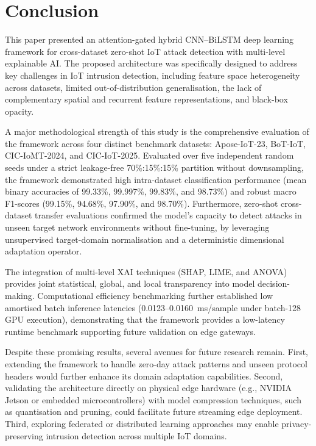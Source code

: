 \documentclass[a4paper,fleqn]{cas-sc}
\begin{document}
\section{Conclusion}
\label{sec:conclusion}
This paper presented an attention-gated hybrid CNN--BiLSTM deep learning framework for cross-dataset zero-shot IoT attack detection with multi-level explainable AI. The proposed architecture was specifically designed to address key challenges in IoT intrusion detection, including feature space heterogeneity across datasets, limited out-of-distribution generalisation, the lack of complementary spatial and recurrent feature representations, and black-box opacity.

A major methodological strength of this study is the comprehensive evaluation of the framework across four distinct benchmark datasets: Apose-IoT-23, BoT-IoT, CIC-IoMT-2024, and CIC-IoT-2025. Evaluated over five independent random seeds under a strict leakage-free 70\%:15\%:15\% partition without downsampling, the framework demonstrated high intra-dataset classification performance (mean binary accuracies of 99.33\%, 99.997\%, 99.83\%, and 98.73\%) and robust macro F1-scores (99.15\%, 94.68\%, 97.90\%, and 98.70\%). Furthermore, zero-shot cross-dataset transfer evaluations confirmed the model's capacity to detect attacks in unseen target network environments without fine-tuning, by leveraging unsupervised target-domain normalisation and a deterministic dimensional adaptation operator.

The integration of multi-level XAI techniques (SHAP, LIME, and ANOVA) provides joint statistical, global, and local transparency into model decision-making. Computational efficiency benchmarking further established low amortised batch inference latencies (0.0123--0.0160~ms/sample under batch-128 GPU execution), demonstrating that the framework provides a low-latency runtime benchmark supporting future validation on edge gateways.

Despite these promising results, several avenues for future research remain. First, extending the framework to handle zero-day attack patterns and unseen protocol headers would further enhance its domain adaptation capabilities. Second, validating the architecture directly on physical edge hardware (e.g., NVIDIA Jetson or embedded microcontrollers) with model compression techniques, such as quantisation and pruning, could facilitate future streaming edge deployment. Third, exploring federated or distributed learning approaches may enable privacy-preserving intrusion detection across multiple IoT domains.
\end{document}
